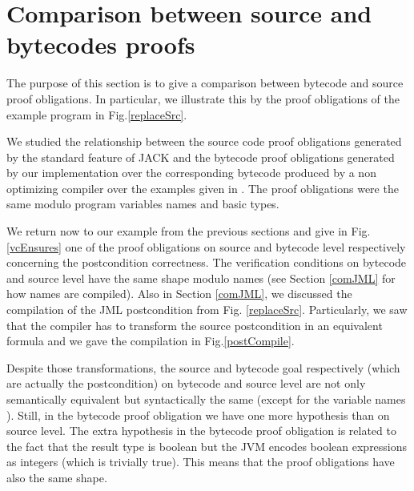 
\section{Comparison between source and bytecodes proofs}  \label{results}

The purpose of this section is to give a comparison between bytecode and source proof obligations.
In particular, we illustrate this by the proof obligations of the example program in Fig.\ref{replaceSrc}.

We studied the relationship between the source code proof obligations generated 
by the standard feature of JACK and the bytecode proof obligations generated by our implementation over the corresponding bytecode
 produced by a non optimizing compiler over the examples given in \cite{JPVC03JKM}. The proof obligations were the same modulo 
program variables names and basic types.

 We return now to our example from the previous sections and give in Fig.\ref{vcEnsures} one of the proof obligations on source 
and bytecode level respectively concerning the postcondition correctness. The verification conditions on bytecode and source level
 have the same shape modulo names (see Section \ref{comJML} for how names are compiled). Also in Section
 \ref{comJML}, we discussed the compilation of the JML postcondition from Fig. \ref{replaceSrc}. Particularly,
 we saw that the compiler has to transform the source postcondition in an equivalent formula and we
 gave the compilation in Fig.\ref{postCompile}. 

Despite those transformations, the source and bytecode goal respectively (which are actually the postcondition) on bytecode and source level are not only
semantically equivalent but syntactically the same (except for the variable names ). Still, in the bytecode proof obligation we have one more hypothesis than on source level. The extra hypothesis in the bytecode proof obligation is related to the fact that the result type is boolean but the JVM encodes boolean expressions as integers (which is trivially true). This means that the proof obligations have also the same shape.


